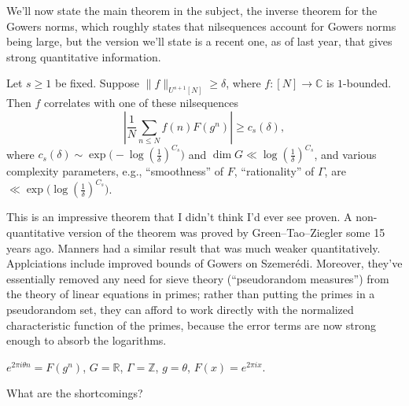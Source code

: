 \documentclass[reqno]{amsart} 
\numberwithin{theorem}{section}
\numberwithin{equation}{section}
\begin{document}
We'll now state the main theorem in the subject, the inverse theorem for the Gowers norms, which roughly states that nilsequences account for Gowers norms being large, but the version we'll state is a recent one, as of last year, that gives strong quantitative information.
\begin{theorem}
  Let $s \geq 1$ be fixed.  Suppose $\lVert f \rVert_{U^{s + 1}[N]} \geq \delta$, where $f :[N] \rightarrow \mathbb{C}$ is $1$-bounded.  Then $f$ correlates with one of these nilsequences
  \begin{equation*}
    \left\lvert
      \frac{1}{N}
      \sum_{n \leq N}
      f(n) F(g^n)
    \right\rvert
    \geq c_s(\delta),
  \end{equation*}
  where $c_s(\delta) \sim \exp\bigl(- \log(\tfrac{1}{\delta})^{C_s}\bigr)$ and $\dim G \ll \log(\tfrac{1}{\delta})^{C_s}$, and various complexity parameters, e.g., ``smoothness'' of $F$, ``rationality'' of $\Gamma$, are $\ll \exp\bigl(\log(\tfrac{1}{\delta})^{C_s}\bigr)$.
\end{theorem}
This is an impressive theorem that I didn't think I'd ever see proven.  A non-quantitative version of the theorem was proved by Green--Tao--Ziegler some 15 years ago.  Manners had a similar result that was much weaker quantitatively.  Applciations include improved bounds of Gowers on Szemerédi.  Moreover, they've essentially removed any need for sieve theory (``pseudorandom measures'') from the theory of linear equations in primes; rather than putting the primes in a pseudorandom set, they can afford to work directly with the normalized characteristic function of the primes, because the error terms are now strong enough to absorb the logarithms.
\begin{example}
  $e^{2 \pi i \theta n} = F(g^n)$, $G = \mathbb{R}$, $\Gamma = \mathbb{Z}$, $g = \theta$, $F(x) = e^{2 \pi i x}$.
\end{example}
What are the shortcomings?
\end{document}
